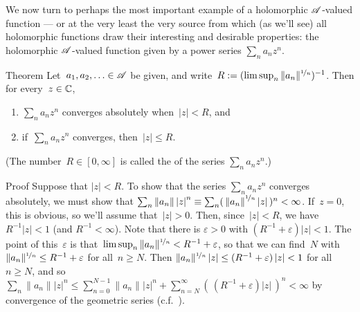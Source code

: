 \documentclass[a]{subfiles}
\begin{document}
\begin{parsec}%
\begin{point}%
We now turn
to perhaps the most important example
of a holomorphic $\mathscr{A}$-valued function ---
or at the very least the very source from
which (as we'll see) all holomorphic functions
draw their interesting and desirable
properties:
the holomorphic $\mathscr{A}$-valued function
given by a power series  $\sum_n a_n z^n$.
\end{point}
\begin{point}[hadamard]{Theorem}%
Let~$a_1,a_2,\dotsc\in\mathscr{A}$
be given,
and write~$R:=(\limsup_n \|a_n\|^{\nicefrac{1}{n}})^{-1}$.
Then for every~$z\in\mathbb{C}$,
\begin{enumerate}
\item
$\sum_n a_n z^n$
converges absolutely
when~$\left|z\right| < R$, and 
\item
if~$\sum_n a_n z^n$ converges,
then~$\left|z\right|\leq R$.
\end{enumerate}
(The number~$R\in[0,\infty]$ is called the 
of the series $\sum_n a_n z^n$.)
\begin{point}{Proof}%
Suppose that $\left|z\right|<R$.
To show that the series 
$\sum_n a_nz^n$ converges absolutely,
we must show that $\sum_n \left\|a_n\right\|\left|z\right|^n
\equiv \sum_n (\,\left\|a_n\right\|^{\nicefrac{1}{n}}\left|z\right|\,)^n
<\infty$.
If~$z=0$, this is obvious,
so we'll assume that~$\left|z\right| > 0$.
Then, since~$\left|z\right|<R$,
we have~$R^{-1}\left|z\right|<1$
(and $R^{-1}<\infty$).
Note that
there is $\varepsilon>0$ with $(R^{-1}+\varepsilon)\left|z\right|<1$.
The point of this~$\varepsilon$
is that~$\limsup_n \|a_n\|^{\nicefrac{1}{n}} 
< R^{-1}+\varepsilon$,
so that we can find~$N$ 
with $\|a_n\|^{\nicefrac{1}{n}} \leq R^{-1}+\varepsilon$
for all~$n\geq N$.
Then $\|a_n\|^{\nicefrac{1}{n}}\left|z\right|
\leq (R^{-1}+\varepsilon)\left|z\right|<1$
for all~$n\geq N$,
and so
$\sum_n \|a_n\|\left|z\right|^n 
\leq\sum_{n=0}^{N-1} \|a_n\|\left|z\right|^n+ \sum_{n=N}^\infty 
(\,(R^{-1}+\varepsilon)\left|z\right|\,)^n < \infty$
by  convergence
of the geometric series (c.f.~).


\end{point}
\end{point}
\end{parsec}
\end{document}
